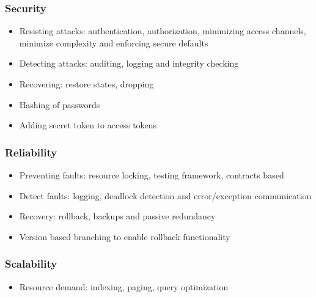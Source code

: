 \documentclass{article}
\begin{document}
		\subsubsection{Security}\label{subsec:security}
		\begin{itemize}
			\item Resisting attacks: authentication, authorization, minimizing access channels, minimize complexity and enforcing secure defaults
			\item Detecting attacks: auditing, logging and integrity checking
			\item Recovering: restore states, dropping
			\item Hashing of passwords
			\item Adding secret token to access tokens
		\end{itemize}

		\subsubsection{Reliability}\label{subsec:reliability}
		\begin{itemize}
			\item Preventing faults: resource locking, testing framework, contracts based
			\item Detect faults: logging, deadlock detection and error/exception communication
			\item Recovery: rollback, backups and passive redundancy
			\item Version based branching to enable rollback functionality
		\end{itemize}

		\subsubsection{Scalability}\label{subsec:scalability}
		\begin{itemize}
			\item Resource demand: indexing, paging, query optimization
		\end{itemize}
\end{document}
